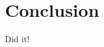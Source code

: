 \documentclass[12pt,glossary]{dalthesis}
\begin{document}
\begin{table}[]
\begin{tabular}{|l||c|c||c|c||c|c||c|c||c|c||c|c|}
\end{tabular}
\end{table}

\chapter{Conclusion}

Did it!



\end{document}
